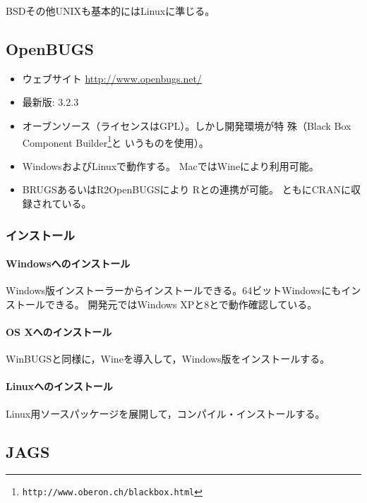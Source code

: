 \documentclass[11pt,uplatex]{jsarticle}
\begin{document}
BSDその他UNIXも基本的にはLinuxに準じる。

\subsection{OpenBUGS}

\begin{itemize}
\item ウェブサイト \url{http://www.openbugs.net/}
\item 最新版: 3.2.3
\item オーブンソース（ライセンスはGPL）。しかし開発環境が特
  殊（Black Box Component Builder\footnote{\texttt{http://www.oberon.ch/blackbox.html}}と
  いうものを使用）。
\item WindowsおよびLinuxで動作する。
Macでは\textsf{Wine}により利用可能。
\item \textsf{BRUGS}あるいは\textsf{R2OpenBUGS}により
\textsf{R}との連携が可能\cite{Thomas}。
ともにCRANに収録されている。
\end{itemize}

\subsubsection*{インストール}
\paragraph{Windowsへのインストール}
Windows版インストーラーからインストールできる。64ビットWindowsにもインストールできる。
開発元ではWindows XPと8とで動作確認している。

\paragraph{OS Xへのインストール}
\textsf{WinBUGS}と同様に，\textsf{Wine}を導入して，Windows版をインストールする。

\paragraph{Linuxへのインストール}
Linux用ソースパッケージを展開して，コンパイル・インストールする。

\subsection{JAGS}
\end{document}
